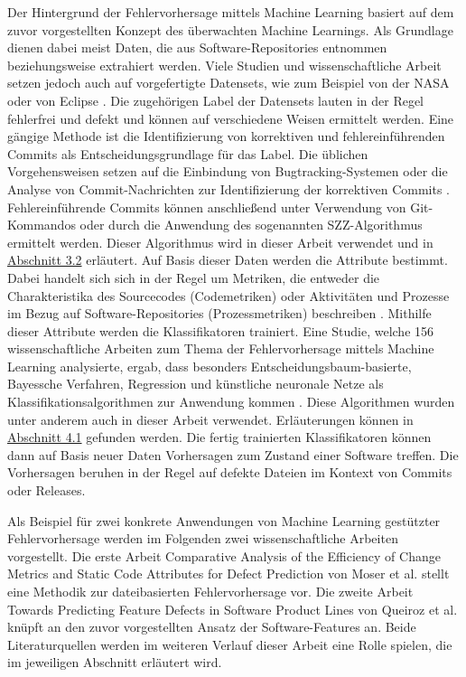 Der Hintergrund der Fehlervorhersage mittels Machine Learning basiert auf dem zuvor vorgestellten Konzept des überwachten Machine Learnings. Als Grundlage dienen dabei meist Daten, die aus Software-Repositories entnommen beziehungsweise extrahiert werden. Viele Studien und wissenschaftliche Arbeit setzen jedoch auch auf vorgefertigte Datensets, wie zum Beispiel von der NASA oder von Eclipse \cite{Son2019}. Die zugehörigen Label der Datensets lauten in der Regel \glqq fehlerfrei\grqq{} und \glqq defekt\grqq{} und können auf verschiedene Weisen ermittelt werden. Eine gängige Methode ist die Identifizierung von korrektiven und fehlereinführenden Commits als Entscheidungsgrundlage für das Label. Die üblichen Vorgehensweisen setzen auf die Einbindung von Bugtracking-Systemen oder die Analyse von Commit-Nachrichten zur Identifizierung der korrektiven Commits \cite{Queiroz2016,Zimmermann2007}. Fehlereinführende Commits können anschließend unter Verwendung von Git-Kommandos oder durch die Anwendung des sogenannten SZZ-Algorithmus ermittelt werden. Dieser Algorithmus wird in dieser Arbeit verwendet und in \hyperref[szz-def]{Abschnitt 3.2} erläutert. Auf Basis dieser Daten werden die Attribute bestimmt. Dabei handelt sich sich in der Regel um Metriken, die entweder die Charakteristika des Sourcecodes (Codemetriken) oder Aktivitäten und Prozesse im Bezug auf Software-Repositories (Prozessmetriken) beschreiben \cite{Son2019,Rahman2013}. Mithilfe dieser Attribute werden die Klassifikatoren trainiert. Eine Studie, welche 156 wissenschaftliche Arbeiten zum Thema der Fehlervorhersage mittels Machine Learning analysierte, ergab, dass besonders Entscheidungsbaum-basierte, Bayessche Verfahren, Regression und künstliche neuronale Netze als Klassifikationsalgorithmen zur Anwendung kommen \cite{Son2019}. Diese Algorithmen wurden unter anderem auch in dieser Arbeit verwendet. Erläuterungen können in \hyperref[algorithms]{Abschnitt 4.1} gefunden werden. Die fertig trainierten Klassifikatoren können dann auf Basis neuer Daten Vorhersagen zum Zustand einer Software treffen. Die Vorhersagen beruhen in der Regel auf defekte Dateien im Kontext von Commits oder Releases.

Als Beispiel für zwei konkrete Anwendungen von Machine Learning gestützter Fehlervorhersage werden im Folgenden zwei wissenschaftliche Arbeiten vorgestellt. Die erste Arbeit \glqq Comparative Analysis of the Efficiency of Change Metrics and Static Code Attributes for Defect Prediction\grqq{} von Moser et al. \cite{Moser2008} stellt eine Methodik zur dateibasierten Fehlervorhersage vor. Die zweite Arbeit \glqq Towards Predicting Feature Defects in Software Product Lines\grqq{} von Queiroz et al. \cite{Queiroz2016} knüpft an den zuvor vorgestellten Ansatz der Software-Features an. Beide Literaturquellen werden im weiteren Verlauf dieser Arbeit eine Rolle spielen, die im jeweiligen Abschnitt erläutert wird.

